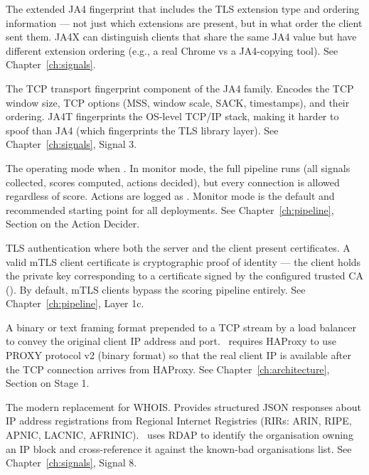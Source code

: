 \begin{description}[leftmargin=0pt, style=nextline, itemsep=8pt]
  \item[JA4X\index{JA4X}]
  The extended JA4 fingerprint that includes the TLS extension type and ordering
  information — not just which extensions are present, but in what order the client
  sent them. JA4X can distinguish clients that share the same JA4 value but have
  different extension ordering (e.g., a real Chrome vs a JA4-copying tool).
  See Chapter~\ref{ch:signals}.

  \item[JA4T\index{JA4T}]
  The TCP transport fingerprint component of the JA4 family. Encodes the TCP window
  size, TCP options (MSS, window scale, SACK, timestamps), and their ordering.
  JA4T fingerprints the OS-level TCP/IP stack, making it harder to spoof than JA4
  (which fingerprints the TLS library layer).
  See Chapter~\ref{ch:signals}, Signal 3.

  \item[Monitor mode\index{monitor mode}]
  The operating mode when . In monitor mode, the full pipeline runs
  (all signals collected, scores computed, actions decided), but every connection is
  allowed regardless of score. Actions are logged as \badgemonitor. Monitor mode
  is the default and recommended starting point for all deployments.
  See Chapter~\ref{ch:pipeline}, Section on the Action Decider.

  \item[mTLS (Mutual TLS)\index{mTLS}]
  TLS authentication where both the server and the client present certificates.
  A valid mTLS client certificate is cryptographic proof of identity — the client
  holds the private key corresponding to a certificate signed by the configured
  trusted CA (). By default, mTLS clients bypass
  the scoring pipeline entirely.
  See Chapter~\ref{ch:pipeline}, Layer 1c.

  \item[PROXY protocol\index{PROXY protocol}]
  A binary or text framing format prepended to a TCP stream by a load balancer to
  convey the original client IP address and port. \ja\ requires HAProxy to use
  PROXY protocol v2 (binary format) so that the real client IP is available after
  the TCP connection arrives from HAProxy.
  See Chapter~\ref{ch:architecture}, Section on Stage 1.

  \item[RDAP (Registration Data Access Protocol)\index{RDAP}]
  The modern replacement for WHOIS. Provides structured JSON responses about IP
  address registrations from Regional Internet Registries (RIRs: ARIN, RIPE, APNIC,
  LACNIC, AFRINIC). \ja\ uses RDAP to identify the organisation owning an IP block
  and cross-reference it against the known-bad organisations list.
  See Chapter~\ref{ch:signals}, Signal 8.


\end{description}
